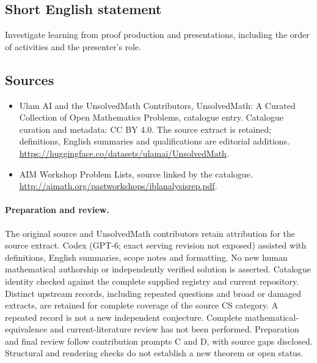 \documentclass[11pt]{article}
\begin{document}
\subsection{Short English statement}
Investigate learning from proof production and presentations, including the order of activities and the presenter's role.
\subsection{Sources}
\begin{itemize}
\item[\hypertarget{source:statement:1}{S1}] Ulam AI and the UnsolvedMath Contributors, UnsolvedMath: A Curated Collection of Open Mathematics Problems, catalogue entry. Catalogue curation and metadata: CC BY 4.0. The source extract is retained; definitions, English summaries and qualifications are editorial additions.
\url{https://huggingface.co/datasets/ulamai/UnsolvedMath}.
\item[\hypertarget{source:statement:2}{S2}] AIM Workshop Problem Lists, source linked by the catalogue.
\url{http://aimath.org/pastworkshops/iblanalysisrep.pdf}.
\end{itemize}
\paragraph{Preparation and review.}
The original source and UnsolvedMath contributors retain attribution for the source extract. Codex (GPT-6; exact serving revision not exposed) assisted with definitions, English summaries, scope notes and formatting. No new human mathematical authorship or independently verified solution is asserted. Catalogue identity checked against the complete supplied registry and current repository. Distinct upstream records, including repeated questions and broad or damaged extracts, are retained for complete coverage of the source CS category. A repeated record is not a new independent conjecture. Complete mathematical-equivalence and current-literature review has not been performed. Preparation and final review follow contribution prompts C and D, with source gaps disclosed. Structural and rendering checks do not establish a new theorem or open status.
\label{end:statement}
\end{document}

